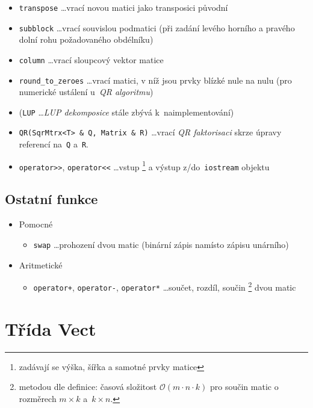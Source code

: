 \documentclass[11pt,a4paper]{article}
\theoremstyle{remark}
\begin{document}
\begin{itemize}
\begin{itemize}
    \item \verb~transpose~ \ldots vrací novou matici jako transposici původní
    \item \verb~subblock~ \ldots vrací souvislou podmatici (při zadání levého
      horního a pravého dolní rohu požadovaného obdélníku)
    \item \verb~column~ \ldots vrací sloupcový vektor matice
    \item \verb~round_to_zeroes~ \ldots vrací matici, v níž jsou prvky blízké
      nule na nulu  (pro numerické ustálení
      u~\emph{QR algoritmu\/})
    \item (\verb~LUP~ \ldots \emph{LUP dekomposice\/} stále zbývá
      k~naimplementování)
    \item \verb~QR(SqrMtrx<T> & Q, Matrix & R)~ \ldots vrací \emph{QR
    faktorisaci\/} skrze úpravy referencí na~\verb~Q~ a~\verb~R~.
    \item \verb~operator>>~, \verb~operator<<~ \ldots vstup\thinspace%
      \footnote{zadávají se výška, šířka a samotné prvky matice}
      a výstup z/do~\verb~iostream~ objektu
  \end{itemize}
\end{itemize}

\subsection{Ostatní funkce}

\begin{itemize}
\item Pomocné
  \begin{itemize}
  \item \verb~swap~ \ldots prohození dvou matic (binární zápis namísto
    zápisu unárního)
  \end{itemize}
\item Aritmetické
  \begin{itemize}
  \item \verb~operator+~, \verb~operator-~, \verb~operator*~ \ldots součet,
    rozdíl, součin\thinspace%
    \footnote{metodou dle definice: časová složitost $\mathcal{O}(m \cdot n
    \cdot k)$ pro součin matic o rozměrech $m \times k$ a~$k \times n$.}
    dvou matic
  \end{itemize}
\end{itemize}

\section{Třída Vect}
\end{document}
